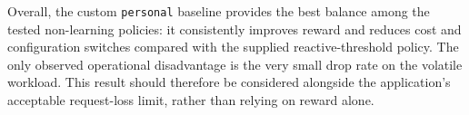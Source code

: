 \documentclass[a4paper,11pt]{article}
\begin{document}
Overall, the custom \texttt{personal} baseline provides the best balance
among the tested non-learning policies: it consistently improves reward
and reduces cost and configuration switches compared with the supplied
reactive-threshold policy. The only observed operational disadvantage is
the very small drop rate on the volatile workload. This result should
therefore be considered alongside the application's acceptable request-loss
limit, rather than relying on reward alone.
\end{document}

